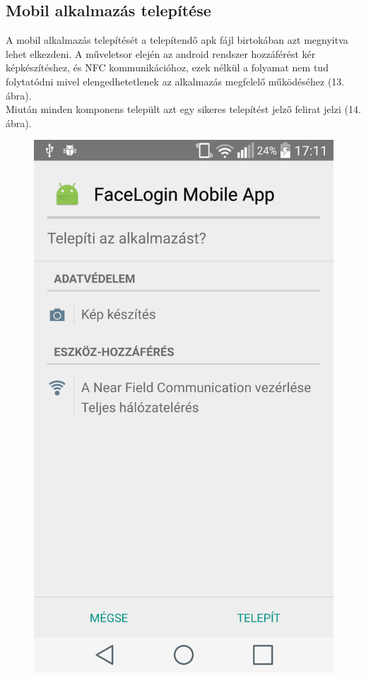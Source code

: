 \subsection{Mobil alkalmazás telepítése}
A mobil alkalmazás telepítését a telepítendő apk fájl birtokában azt megnyitva lehet elkezdeni. A műveletsor elején az android rendszer hozzáférést kér képkészítéshez, és NFC kommunikációhoz, ezek nélkül a folyamat nem tud folytatódni mivel elengedhetetlenek az alkalmazás megfelelő működéséhez (13. ábra).
\\Miután minden komponens települt azt egy sikeres telepítést jelző felirat jelzi (14. ábra).
\begin{figure}[h]
 \begin{minipage}{.5\textwidth} 
\centering
    \includegraphics[scale=0.10]{img/install_app}

\end{minipage}
\end{figure}
